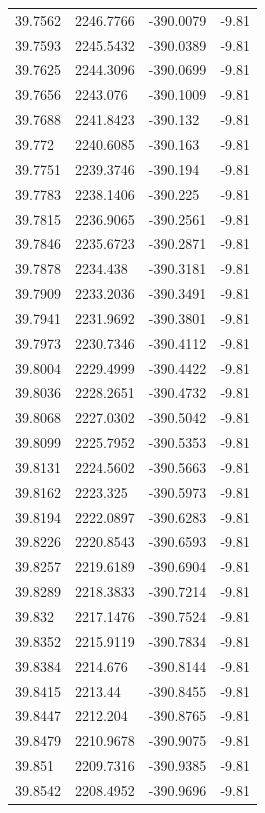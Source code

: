 \begin{table}[H]
\begin{tabular}{llll}
39.7562 & 2246.7766 & -390.0079 & -9.81 \\
39.7593 & 2245.5432 & -390.0389 & -9.81 \\
39.7625 & 2244.3096 & -390.0699 & -9.81 \\
39.7656 & 2243.076 & -390.1009 & -9.81 \\
39.7688 & 2241.8423 & -390.132 & -9.81 \\
39.772 & 2240.6085 & -390.163 & -9.81 \\
39.7751 & 2239.3746 & -390.194 & -9.81 \\
39.7783 & 2238.1406 & -390.225 & -9.81 \\
39.7815 & 2236.9065 & -390.2561 & -9.81 \\
39.7846 & 2235.6723 & -390.2871 & -9.81 \\
39.7878 & 2234.438 & -390.3181 & -9.81 \\
39.7909 & 2233.2036 & -390.3491 & -9.81 \\
39.7941 & 2231.9692 & -390.3801 & -9.81 \\
39.7973 & 2230.7346 & -390.4112 & -9.81 \\
39.8004 & 2229.4999 & -390.4422 & -9.81 \\
39.8036 & 2228.2651 & -390.4732 & -9.81 \\
39.8068 & 2227.0302 & -390.5042 & -9.81 \\
39.8099 & 2225.7952 & -390.5353 & -9.81 \\
39.8131 & 2224.5602 & -390.5663 & -9.81 \\
39.8162 & 2223.325 & -390.5973 & -9.81 \\
39.8194 & 2222.0897 & -390.6283 & -9.81 \\
39.8226 & 2220.8543 & -390.6593 & -9.81 \\
39.8257 & 2219.6189 & -390.6904 & -9.81 \\
39.8289 & 2218.3833 & -390.7214 & -9.81 \\
39.832 & 2217.1476 & -390.7524 & -9.81 \\
39.8352 & 2215.9119 & -390.7834 & -9.81 \\
39.8384 & 2214.676 & -390.8144 & -9.81 \\
39.8415 & 2213.44 & -390.8455 & -9.81 \\
39.8447 & 2212.204 & -390.8765 & -9.81 \\
39.8479 & 2210.9678 & -390.9075 & -9.81 \\
39.851 & 2209.7316 & -390.9385 & -9.81 \\
39.8542 & 2208.4952 & -390.9696 & -9.81 \\

\end{tabular}
\end{table}
